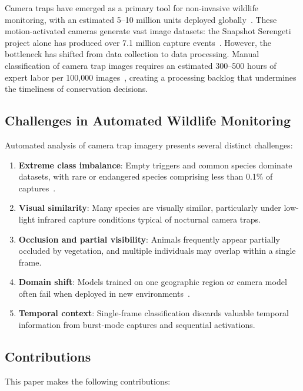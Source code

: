 \documentclass[11pt,letterpaper]{article}
\begin{document}
Camera traps have emerged as a primary tool for non-invasive wildlife monitoring, with an estimated 5--10 million units deployed globally~\cite{steenweg2017}. These motion-activated cameras generate vast image datasets: the Snapshot Serengeti project alone has produced over 7.1 million capture events~\cite{swanson2015}. However, the bottleneck has shifted from data collection to data processing. Manual classification of camera trap images requires an estimated 300--500 hours of expert labor per 100,000 images~\cite{tabak2019}, creating a processing backlog that undermines the timeliness of conservation decisions.

\subsection{Challenges in Automated Wildlife Monitoring}

Automated analysis of camera trap imagery presents several distinct challenges:

\begin{enumerate}[leftmargin=*]
    \item \textbf{Extreme class imbalance}: Empty triggers and common species dominate datasets, with rare or endangered species comprising less than 0.1\% of captures~\cite{beery2019}.
    \item \textbf{Visual similarity}: Many species are visually similar, particularly under low-light infrared capture conditions typical of nocturnal camera traps.
    \item \textbf{Occlusion and partial visibility}: Animals frequently appear partially occluded by vegetation, and multiple individuals may overlap within a single frame.
    \item \textbf{Domain shift}: Models trained on one geographic region or camera model often fail when deployed in new environments~\cite{beery2018}.
    \item \textbf{Temporal context}: Single-frame classification discards valuable temporal information from burst-mode captures and sequential activations.
\end{enumerate}

\subsection{Contributions}

This paper makes the following contributions:
\end{document}
